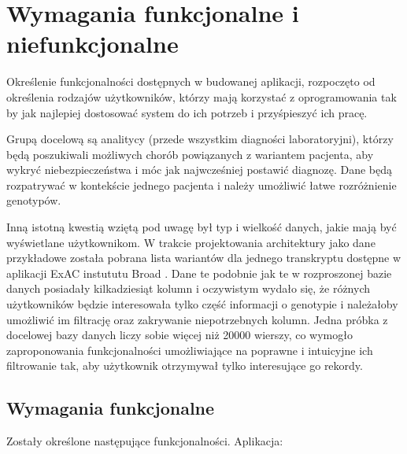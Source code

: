 \documentclass[a4paper,12pt,twoside]{article}
\begin{document}
\section{Wymagania funkcjonalne i niefunkcjonalne}

Określenie funkcjonalności dostępnych w budowanej aplikacji, rozpoczęto od określenia
rodzajów użytkowników, którzy mają korzystać z oprogramowania tak by jak najlepiej dostosować system do ich potrzeb i przyśpieszyć ich pracę.

Grupą docelową są analitycy (przede wszystkim diagności laboratoryjni), którzy będą poszukiwali możliwych chorób powiązanych z wariantem pacjenta, aby wykryć niebezpieczeństwa i móc jak najwcześniej postawić diagnozę.
Dane będą rozpatrywać w kontekście jednego pacjenta i należy umożliwić łatwe rozróżnienie genotypów.

Inną istotną kwestią wziętą pod uwagę był typ i wielkość danych, jakie mają być wyświetlane użytkownikom.
W trakcie projektowania architektury jako dane przykładowe została pobrana lista wariantów dla jednego transkryptu dostępne w aplikacji ExAC instututu Broad \cite{exac} \cite{exacCite}. Dane te
podobnie jak te w rozproszonej bazie danych posiadały kilkadziesiąt kolumn i oczywistym wydało się, że różnych użytkowników będzie interesowała tylko część informacji o genotypie i należałoby umożliwić im filtrację oraz zakrywanie niepotrzebnych kolumn.
Jedna próbka z docelowej bazy danych liczy sobie więcej niż 20000 wierszy, co wymogło zaproponowania
funkcjonalności umożliwiające na poprawne i intuicyjne ich filtrowanie
tak, aby użytkownik otrzymywał tylko interesujące go rekordy.

\subsection{Wymagania funkcjonalne}
Zostały określone następujące funkcjonalności. Aplikacja:
\end{document}
